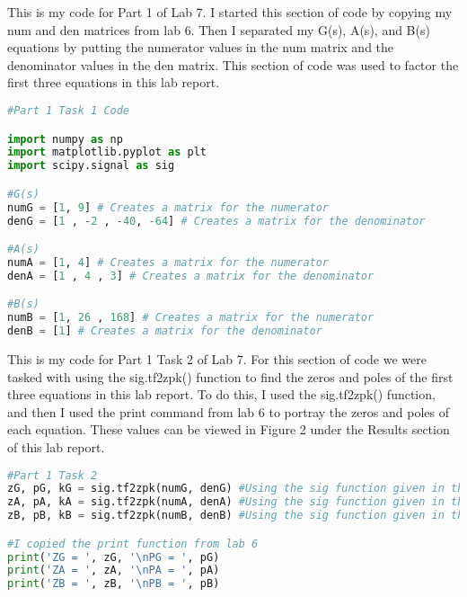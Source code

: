 \documentclass[12pt]{report}
\begin{document}
This is my code for Part 1 of Lab 7. I started this section of code by copying my num and den matrices from lab 6. Then I separated my G(s), A(s), and B(s) equations by putting the numerator values in the num matrix and the denominator values in the den matrix. This section of code was used to factor the first three equations in this lab report.
\begin{lstlisting}[language=Python]
#Part 1 Task 1 Code

import numpy as np
import matplotlib.pyplot as plt
import scipy.signal as sig

#G(s)
numG = [1, 9] # Creates a matrix for the numerator
denG = [1 , -2 , -40, -64] # Creates a matrix for the denominator

#A(s)
numA = [1, 4] # Creates a matrix for the numerator
denA = [1 , 4 , 3] # Creates a matrix for the denominator

#B(s)
numB = [1, 26 , 168] # Creates a matrix for the numerator
denB = [1] # Creates a matrix for the denominator

\end{lstlisting}

{This is my code for Part 1 Task 2 of Lab 7. For this section of code we were tasked with using the sig.tf2zpk() function to find the zeros and poles of the first three equations in this lab report. To do this, I used the sig.tf2zpk() function, and then I used the print command from lab 6 to portray the zeros and poles of each equation. These values can be viewed in Figure 2 under the Results section of this lab report.   }
\begin{lstlisting}[language=Python]
#Part 1 Task 2
zG, pG, kG = sig.tf2zpk(numG, denG) #Using the sig function given in the handout
zA, pA, kA = sig.tf2zpk(numA, denA) #Using the sig function given in the handout
zB, pB, kB = sig.tf2zpk(numB, denB) #Using the sig function given in the handout

#I copied the print function from lab 6
print('ZG = ', zG, '\nPG = ', pG) 
print('ZA = ', zA, '\nPA = ', pA)
print('ZB = ', zB, '\nPB = ', pB)
\end{lstlisting}
\end{document}
